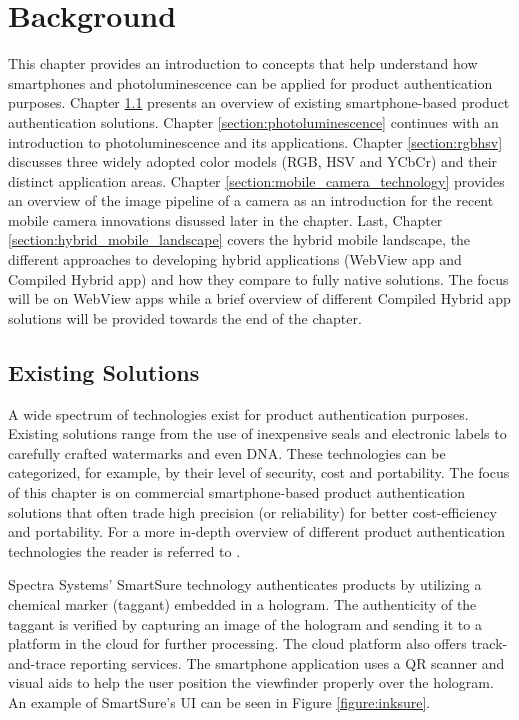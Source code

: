 \documentclass[thesis.tex]{subfiles}
\begin{document}
\chapter{Background}
\label{chapter:background}

This chapter provides an introduction to concepts that help understand how smartphones and photoluminescence can be applied for product authentication purposes. Chapter \ref{section:existing_solutions} presents an overview of existing smartphone-based product authentication solutions. Chapter \ref{section:photoluminescence} continues with an introduction to photoluminescence and its applications. Chapter \ref{section:rgbhsv} discusses three widely adopted color models (RGB, HSV and YCbCr) and their distinct application areas. Chapter \ref{section:mobile_camera_technology} provides an overview of the image pipeline of a camera as an introduction for the recent mobile camera innovations disussed later in the chapter. Last, Chapter \ref{section:hybrid_mobile_landscape} covers the hybrid mobile landscape, the different approaches to developing hybrid applications (WebView app and Compiled Hybrid app) and how they compare to fully native solutions. The focus will be on WebView apps while a brief overview of different Compiled Hybrid app solutions will be provided towards the end of the chapter.


\section{Existing Solutions}
\label{section:existing_solutions}

A wide spectrum of technologies exist for product authentication purposes. Existing solutions range from the use of inexpensive seals and electronic labels to carefully crafted watermarks and even DNA. These technologies can be categorized, for example, by their level of security, cost and portability. The focus of this chapter is on commercial smartphone-based product authentication solutions that often trade high precision (or reliability) for better cost-efficiency and portability. For a more in-depth overview of different product authentication technologies the reader is referred to \cite{kuosmanen}.

Spectra Systems' SmartSure technology authenticates products by utilizing a chemical marker (taggant) embedded in a hologram. The authenticity of the taggant is verified by capturing an image of the hologram and sending it to a platform in the cloud for further processing. The cloud platform also offers track-and-trace reporting services. The smartphone application uses a QR scanner and visual aids to help the user position the viewfinder properly over the hologram. \cite{inksure} An example of SmartSure's UI can be seen in Figure \ref{figure:inksure}.
\end{document}
